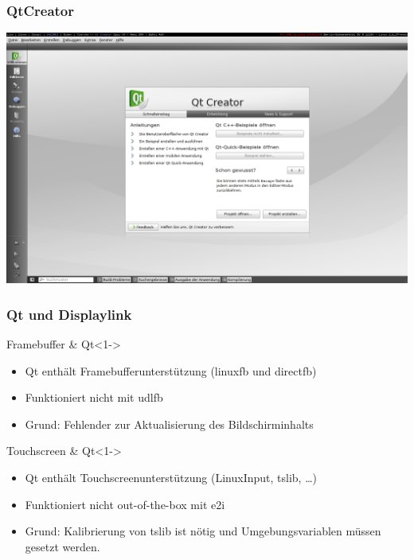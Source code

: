 \documentclass{beamer}
\begin{document}
  \begin{frame}
    \frametitle{QtCreator}
    \includegraphics[scale=0.2]{img/qtcreator.png}
  \end{frame}
	
	\begin{frame}
		\frametitle{Qt und Displaylink}
    \begin{block}{Framebuffer \& Qt}<1->
      \begin{itemize}
        \item<2-> Qt enthält Framebufferunterstützung (linuxfb und directfb)
        \item<3-> Funktioniert nicht mit udlfb
        \item<4-> Grund: Fehlender \hyperlink{ioctl}{}
          \hypertarget{backtoqt}{} zur Aktualisierung des Bildschirminhalts 
      \end{itemize}
    \end{block}
    \begin{block}{Touchscreen \& Qt}<1->
        \begin{itemize}
          \item<5-> Qt enthält Touchscreenunterstützung (LinuxInput, tslib, \ldots)
          \item<6-> Funktioniert nicht out-of-the-box mit e2i
          \item<7-> Grund: Kalibrierung von tslib ist nötig und Umgebungsvariablen müssen gesetzt
            werden.
        \end{itemize}
    \end{block}
	\end{frame}
	
\end{document}
